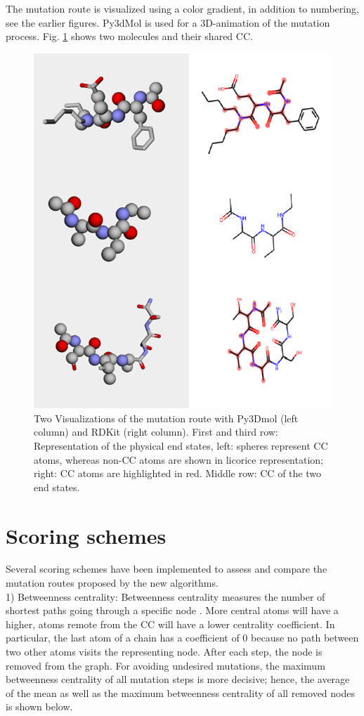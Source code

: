 The mutation route is visualized using a color gradient, in addition
to numbering, see the earlier figures.
Py3dMol \cite{key-4} is used for a 3D-animation of the mutation process. Fig. \ref{fig:py3dmol} shows two molecules and their shared CC.

\begin{figure}
\includegraphics[scale=0.95]{trafo_py3d_2}

\caption{Two Visualizations of the mutation route with Py3Dmol (left column) and RDKit (right column). First and third row: Representation of the physical end states, left: spheres represent CC atoms, whereas non-CC atoms are shown in licorice representation; right: CC atoms are highlighted in red. Middle row: CC of the two end states.
}
\label{fig:py3dmol}
\end{figure}


\section{Scoring schemes}

Several scoring schemes have been implemented to assess and compare
the mutation routes proposed by the new algorithms.\\
1) Betweenness centrality: Betweenness centrality measures the number
of shortest paths going through a specific node \cite{Newman.2010}. More central atoms
will have a higher, atoms remote from
the CC will have a lower centrality coefficient. In particular, the last atom of a chain
has a coefficient of 0 because no path between two other atoms visits
the representing node. After each step, the node is removed from
the graph.
For avoiding undesired mutations, the maximum betweenness centrality
of all mutation steps is more decisive; hence, the average of the mean
as well as the maximum betweenness centrality of all removed nodes
is shown below.

